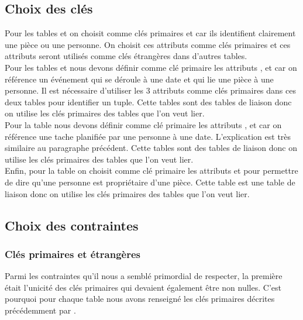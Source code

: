 \subsection{Choix des clés}
Pour les tables \textbf{} et \textbf{} on choisit comme clés primaires  et  car ils identifient clairement une pièce ou une personne. On choisit ces attributs comme clés primaires et ces attributs seront utilisés comme clés étrangères dans d'autres tables.\\

Pour les tables \textbf{} et \textbf{} nous devons définir comme clé primaire les attributs ,  et  car on référence un événement qui se déroule à une date et qui lie une pièce à une personne. Il est nécessaire d'utiliser les 3 attributs comme clés primaires dans ces deux tables pour identifier un tuple. Cette tables sont des tables de liaison donc on utilise les clés primaires des tables que l'on veut lier.\\

Pour la table \textbf{}  nous devons définir comme clé primaire les attributs ,  et  car on référence une tache planifiée par une personne à une date. L'explication est très similaire au paragraphe précédent. Cette tables sont des tables de liaison donc on utilise les clés primaires des tables que l'on veut lier.\\

Enfin, pour la table \textbf{} on choisit comme clé primaire les attributs  et  pour permettre de dire qu'une personne est propriétaire d'une pièce. Cette table est une table de liaison donc on utilise les clés primaires des tables que l'on veut lier.


\subsection{Choix des contraintes}
\subsubsection{Clés primaires et étrangères}
	Parmi les contraintes qu'il nous a semblé primordial de respecter, la première était l'unicité des clés primaires qui devaient également être non nulles. C'est pourquoi pour chaque table nous avons renseigné les clés primaires décrites précédemment par .\\

